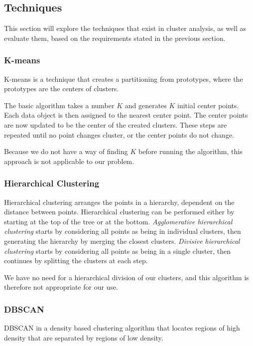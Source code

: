 \subsection{Techniques}
This section will explore the techniques that exist in cluster analysis, as well as evaluate them, based on the requirements stated in the previous section.

\subsubsection{K-means}
K-means is a technique that creates a partitioning from prototypes, where the prototypes are the centers of clusters.

The basic algorithm takes a number $K$ and generates $K$ initial center points.
Each data object is then assigned to the nearest center point.
The center points are now updated to be the center of the created clusters.
These steps are repeated until no point changes cluster, or the center points do not change.

Because we do not have a way of finding $K$ before running the algorithm, this approach is not applicable to our problem.

\subsubsection{Hierarchical Clustering}
Hierarchical clustering arranges the points in a hierarchy, dependent on the distance between points.
Hierarchical clustering can be performed either by starting at the top of the tree or at the bottom.
\textit{Agglomerative hierarchical clustering} starts by considering all points as being in individual clusters, then generating the hierarchy by merging the closest clusters.
\textit{Divisive hierarchical clustering} starts by considering all points as being in a single cluster, then continues by splitting the clusters at each step.

We have no need for a hierarchical division of our clusters, and this algorithm is therefore not appropriate for our use.

\subsubsection{DBSCAN}\label{clustering:DBSCAN}
DBSCAN in a density based clustering algorithm that locates regions of high density that are separated by regions of low density.

